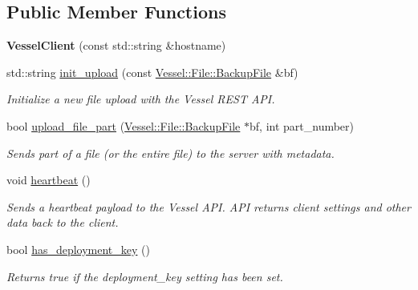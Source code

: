 \subsection*{Public Member Functions}
\begin{DoxyCompactItemize}
\item 
\mbox{\label{class_vessel_1_1_networking_1_1_vessel_client_a8ab68fa2eff83b6439e92194d2077100}} 
{\bfseries Vessel\+Client} (const std\+::string \&hostname)
\item 
std\+::string \hyperlink{class_vessel_1_1_networking_1_1_vessel_client_af024f2016833bd9887d8717e7902f1f4}{init\+\_\+upload} (const \hyperlink{class_vessel_1_1_file_1_1_backup_file}{Vessel\+::\+File\+::\+Backup\+File} \&bf)
\begin{DoxyCompactList}\small\item\em Initialize a new file upload with the Vessel R\+E\+ST A\+PI. \end{DoxyCompactList}\item 
bool \hyperlink{class_vessel_1_1_networking_1_1_vessel_client_ad24179750d17d6314c1c76b0836935b7}{upload\+\_\+file\+\_\+part} (\hyperlink{class_vessel_1_1_file_1_1_backup_file}{Vessel\+::\+File\+::\+Backup\+File} $\ast$bf, int part\+\_\+number)
\begin{DoxyCompactList}\small\item\em Sends part of a file (or the entire file) to the server with metadata. \end{DoxyCompactList}\item 
\mbox{\label{class_vessel_1_1_networking_1_1_vessel_client_a0b2ae6947b82965aa086eed7214a6e38}} 
void \hyperlink{class_vessel_1_1_networking_1_1_vessel_client_a0b2ae6947b82965aa086eed7214a6e38}{heartbeat} ()
\begin{DoxyCompactList}\small\item\em Sends a heartbeat payload to the Vessel A\+PI. A\+PI returns client settings and other data back to the client. \end{DoxyCompactList}\item 
bool \hyperlink{class_vessel_1_1_networking_1_1_vessel_client_ac9236da3c448454791a1c0dff1103f8a}{has\+\_\+deployment\+\_\+key} ()
\begin{DoxyCompactList}\small\item\em Returns true if the deployment\+\_\+key setting has been set. \end{DoxyCompactList}\item 

\end{DoxyCompactItemize}
